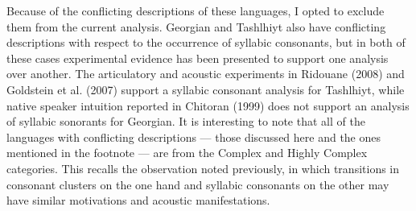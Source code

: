 \documentclass[12pt]{article}
\newenvironment{styleBody}{\renewcommand\baselinestretch{1.0}\setlength\leftskip{0in}\setlength\rightskip{0in plus 1fil}\setlength\parindent{0in}\setlength\parfillskip{0pt plus 1fil}\setlength\parskip{0in plus 1pt}\writerlistparindent\writerlistleftskip\leavevmode\normalfont\normalsize\fontsize{11pt}{13.2pt}\selectfont\mdseries\upshape\writerlistlabel\ignorespaces}{\unskip\vspace{0in plus 1pt}\par}
\newcommand\writerlistleftskip{}
\newcommand\writerlistparindent{}
\newcommand\writerlistlabel{}
\begin{document}
\begin{styleBody}
Because of the conflicting descriptions of these languages, I opted to exclude them from the current analysis. Georgian and Tashlhiyt also have conflicting descriptions with respect to the occurrence of syllabic consonants, but in both of these cases experimental evidence has been presented to support one analysis over another. The articulatory and acoustic experiments in Ridouane (2008) and Goldstein et al. (2007) support a syllabic consonant analysis for Tashlhiyt, while native speaker intuition reported in Chitoran (1999) does not support an analysis of syllabic sonorants for Georgian. It is interesting to note that all of the languages with conflicting descriptions — those discussed here and the ones mentioned in the footnote — are from the Complex and Highly Complex categories. This recalls the observation noted previously, in which transitions in consonant clusters on the one hand and syllabic consonants on the other may have similar motivations and acoustic manifestations.
\end{styleBody}
\end{document}
